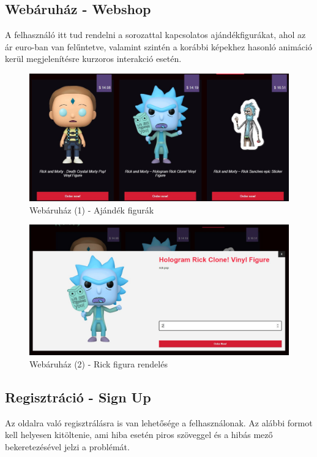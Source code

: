 \documentclass[12pt, titlepage]{article}
\begin{document}
\pagebreak

\subsection{Webáruház - Webshop}
A felhasználó itt tud rendelni a sorozattal kapcsolatos ajándékfigurákat, ahol az ár euro-ban van felűntetve, valamint szintén a korábbi képekhez hasonló animáció kerül megjelenítésre kurzoros interakció esetén.

\begin{figure}[!h]
	\centering
	\includegraphics[width=\linewidth]{images/webshop/1.jpg}
	\caption{Webáruház (1) - Ajándék figurák}
\end{figure}

\begin{figure}[!h]
	\centering
	\includegraphics[width=\linewidth]{images/webshop/2.jpg}
	\caption{Webáruház (2) - Rick figura rendelés}
\end{figure}

\pagebreak

\subsection{Regisztráció - Sign Up}
Az oldalra való regisztrálásra is van lehetősége a felhasználonak. Az alábbi formot kell helyesen kitöltenie, ami hiba esetén piros szöveggel és a hibás mező bekeretezésével jelzi a problémát.
\end{document}
